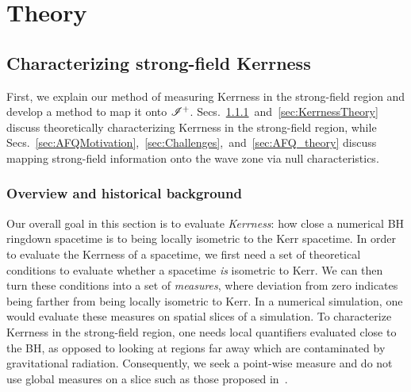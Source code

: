 \section{Theory}
\label{sec:Theory}
\subsection{Characterizing strong-field Kerrness}

\FlowChartFigure

First, we explain our method of measuring Kerrness in the strong-field region and develop a method to map it onto  $\mathscr{I^+}$. Secs.~\ref{sec:KerrnessBackground}~and~\ref{sec:KerrnessTheory} discuss theoretically characterizing Kerrness in the strong-field region, while Secs.~\ref{sec:AFQMotivation},~\ref{sec:Challenges},~and~\ref{sec:AFQ_theory} discuss mapping strong-field information onto the wave zone via null characteristics. 

\subsubsection{Overview and historical background}
\label{sec:KerrnessBackground}
Our overall goal in this section is to evaluate \emph{Kerrness}: how close a numerical BH ringdown spacetime is to being locally isometric to the Kerr spacetime. In order to evaluate the Kerrness of a spacetime, we first need a set of theoretical conditions to evaluate whether a spacetime \textit{is} isometric to Kerr. We can then turn these conditions into a set of \textit{measures}, where deviation from zero indicates being farther from being locally isometric to Kerr. In a numerical simulation, one would evaluate these measures on spatial slices of a simulation. To characterize Kerrness in the strong-field region, one needs local quantifiers evaluated close to the BH, as opposed to looking at regions far away which are contaminated by gravitational radiation. Consequently, we seek a point-wise measure and do not use global measures on a slice such as those proposed in~\cite{Backdahl:2010cy,Backdahl:2010fa,Backdahl:2011np}.



